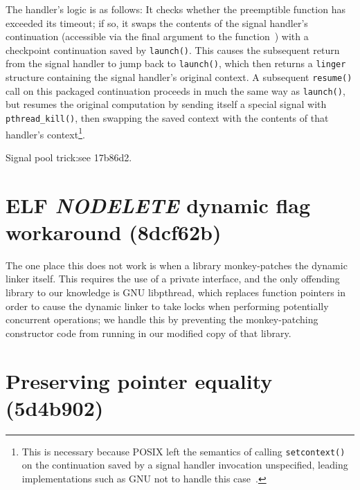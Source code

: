 \documentclass[12pt,letterpaper]{book}
\begin{document}
The handler's logic is as follows:  It checks whether
the preemptible function has exceeded its timeout; if so, it swaps the contents
of the signal handler's continuation (accessible via the final argument to the
function~\cite{sigaction-manpage}) with a checkpoint continuation saved by
\texttt{launch()}.  This causes the subsequent return from the signal handler
to jump back to \texttt{launch()}, which then returns a \texttt{linger}
structure containing the signal handler's original context.  A subsequent
\texttt{resume()} call on this packaged continuation proceeds in much the same
way as \texttt{launch()}, but resumes the original computation by sending
itself a special signal with \texttt{pthread\_kill()}, then swapping the saved
context with the contents of that handler's context\footnote{This is necessary
because POSIX left the semantics of calling \texttt{setcontext()} on the
continuation saved by a signal handler invocation unspecified, leading
implementations such as GNU not to handle this
case~\cite{getcontext-manpage}.}.

Signal pool trick:\@ see 17b86d2.


\section{ELF \textit{NODELETE} dynamic flag workaround (8dcf62b)}

The one place this does not work
is when a library monkey-patches the dynamic linker itself.  This
requires the use of a private interface, and the only offending library to our
knowledge is GNU libpthread, which replaces function pointers in order to cause the
dynamic linker to take locks when performing potentially concurrent operations; we
handle this by preventing the monkey-patching constructor code from running in our
modified copy of that library.


\section{Preserving pointer equality (5d4b902)}
\end{document}
